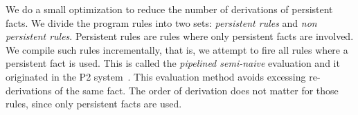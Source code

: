 We do a small optimization to reduce the number of derivations of persistent facts. We
divide the program rules into two sets: \emph{persistent rules} and \emph{non persistent rules}.
Persistent rules are rules where only persistent facts are involved. We compile such rules
incrementally, that is, we attempt to fire all rules where a persistent fact is used. This is called
the \emph{pipelined semi-naive} evaluation and it originated in the P2 system~\cite{Loo-condie-garofalakis-p2}.
This evaluation method avoids excessing re-derivations of the same fact. The order of derivation does not matter for those rules, since
only persistent facts are used.